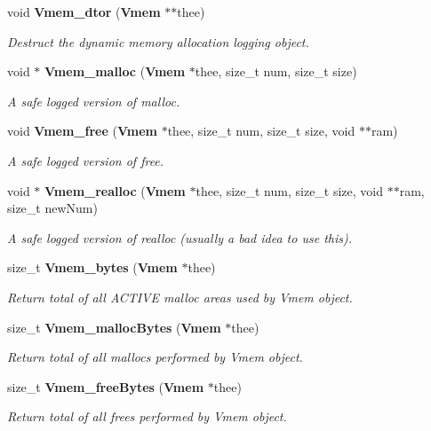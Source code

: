 \begin{DoxyCompactItemize}
void {\bf Vmem\_\-dtor} ({\bf Vmem} $\ast$$\ast$thee)
\begin{DoxyCompactList}\small\item\em Destruct the dynamic memory allocation logging object. \item\end{DoxyCompactList}\item 
void $\ast$ {\bf Vmem\_\-malloc} ({\bf Vmem} $\ast$thee, size\_\-t num, size\_\-t size)
\begin{DoxyCompactList}\small\item\em A safe logged version of malloc. \item\end{DoxyCompactList}\item 
void {\bf Vmem\_\-free} ({\bf Vmem} $\ast$thee, size\_\-t num, size\_\-t size, void $\ast$$\ast$ram)
\begin{DoxyCompactList}\small\item\em A safe logged version of free. \item\end{DoxyCompactList}\item 
void $\ast$ {\bf Vmem\_\-realloc} ({\bf Vmem} $\ast$thee, size\_\-t num, size\_\-t size, void $\ast$$\ast$ram, size\_\-t newNum)
\begin{DoxyCompactList}\small\item\em A safe logged version of realloc (usually a bad idea to use this). \item\end{DoxyCompactList}\item 
size\_\-t {\bf Vmem\_\-bytes} ({\bf Vmem} $\ast$thee)
\begin{DoxyCompactList}\small\item\em Return total of all ACTIVE malloc areas used by Vmem object. \item\end{DoxyCompactList}\item 
size\_\-t {\bf Vmem\_\-mallocBytes} ({\bf Vmem} $\ast$thee)
\begin{DoxyCompactList}\small\item\em Return total of all mallocs performed by Vmem object. \item\end{DoxyCompactList}\item 
size\_\-t {\bf Vmem\_\-freeBytes} ({\bf Vmem} $\ast$thee)
\begin{DoxyCompactList}\small\item\em Return total of all frees performed by Vmem object. \item\end{DoxyCompactList}\item 
$$
\end{DoxyCompactItemize}
